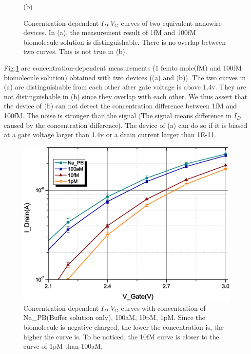 \begin{figure}[!htbp]
\begin{minipage}[t]{1\textwidth}
        (b)
    \end{minipage}
    \caption{Concentration-dependent $I_D$-$V_G$ curves of two equivalent nanowire devices.
    In (a), the measurement result of 1fM and 100fM biomolecule solution is distinguishable. There is no overlap between two curves. This is not true in (b).}
    \label{fig:SD_sucandfail}
\end{figure}

Fig.\ref{fig:SD_sucandfail} are concentration-dependent measurements (1 femto mole(fM) and 100fM biomolecule solution) obtained with two devices ((a) and (b)).
The two curves in (a) are distinguishable from each other after gate voltage is above 1.4v.
They are not distinguishable in (b) since they overlap with each other.
We thus assert that the device of (b) can not detect the concentration difference between 1fM and 100fM.
The noise is stronger than the signal (The signal means difference in $I_D$ caused by the concentration difference).
The device of (a) can do so if it is biased at a gate voltage larger than 1.4v or a drain current larger than 1E-11.

\begin{figure}[!htbp]
        \includegraphics[width=1\textwidth]{images/chapter3/128_allT_mag.eps}
    \caption{Concentration-dependent $I_D$-$V_G$ curves with concentration of Na\_PB(Buffer solution only), 100aM, 10pM, 1pM.
    Since the biomolecule is negative-charged, the lower the concentration is, the higher the curve is.
    To be noticed, the 10fM curve is closer to the curve of 1pM than 100aM.
     }
    \label{fig:SD_allT}
\end{figure}

